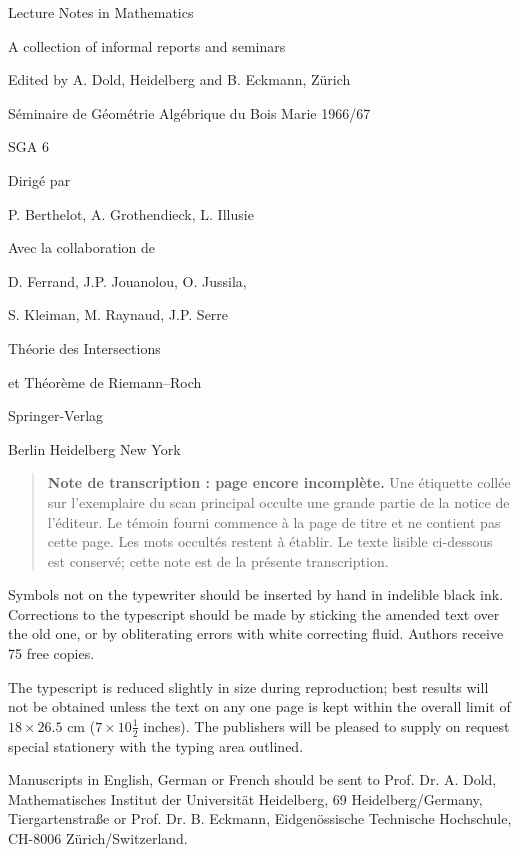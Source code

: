 \begin{center}
{\Large Lecture Notes in Mathematics}\par
A collection of informal reports and seminars\par
Edited by A. Dold, Heidelberg and B. Eckmann, Zürich\par
{}\par
\bigskip
Séminaire de Géométrie Algébrique du Bois Marie 1966/67\par
SGA 6\par
Dirigé par\par
P. Berthelot, A. Grothendieck, L. Illusie\par
Avec la collaboration de\par
D. Ferrand, J.P. Jouanolou, O. Jussila,\par
S. Kleiman, M. Raynaud, J.P. Serre\par
\bigskip
{\Large Théorie des Intersections\par
et Théorème de Riemann--Roch}\par
\bigskip
Springer-Verlag\par
Berlin \textperiodcentered{} Heidelberg \textperiodcentered{} New York
\end{center}

\begin{quote}
\textbf{Note de transcription : page encore incomplète.}
Une étiquette collée sur l'exemplaire du scan principal occulte une grande
partie de la notice de l'éditeur. Le témoin fourni commence à la page de titre
et ne contient pas cette page. Les mots occultés restent à établir. Le texte
lisible ci-dessous est conservé; cette note est de la présente transcription.
\end{quote}

Symbols not on the typewriter should be inserted by hand in indelible black ink.
Corrections to the typescript should be made by sticking the amended text over
the old one, or by obliterating errors with white correcting fluid. Authors
receive 75 free copies.

The typescript is reduced slightly in size during reproduction; best results
will not be obtained unless the text on any one page is kept within the overall
limit of $18\times26.5$ cm ($7\times10\frac12$ inches). The publishers will be
pleased to supply on request special stationery with the typing area outlined.

Manuscripts in English, German or French should be sent to Prof. Dr. A. Dold,
Mathematisches Institut der Universität Heidelberg, 69 Heidelberg/Germany,
Tiergartenstraße or Prof. Dr. B. Eckmann, Eidgenössische Technische Hochschule,
CH-8006 Zürich/Switzerland.

